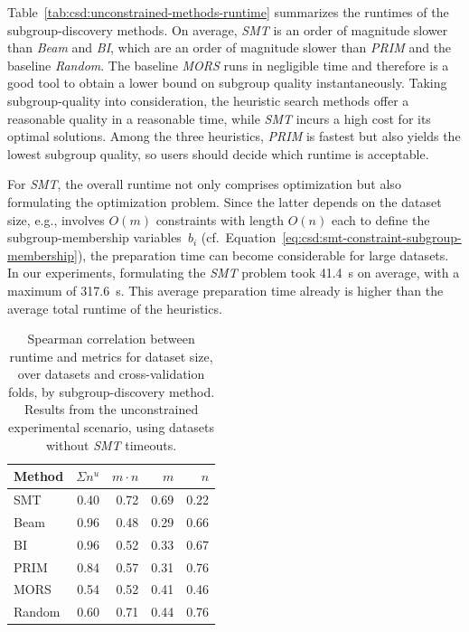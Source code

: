 \documentclass{article}
\theoremstyle{definition}
\begin{document}
Table~\ref{tab:csd:unconstrained-methods-runtime} summarizes the runtimes of the subgroup-discovery methods.
On average, \emph{SMT} is an order of magnitude slower than \emph{Beam} and \emph{BI}, which are an order of magnitude slower than \emph{PRIM} and the baseline \emph{Random}.
The baseline \emph{MORS} runs in negligible time and therefore is a good tool to obtain a lower bound on subgroup quality instantaneously.
Taking subgroup-quality into consideration, the heuristic search methods offer a reasonable quality in a reasonable time, while \emph{SMT} incurs a high cost for its optimal solutions.
Among the three heuristics, \emph{PRIM} is fastest but also yields the lowest subgroup quality, so users should decide which runtime is acceptable.

For \emph{SMT}, the overall runtime not only comprises optimization but also formulating the optimization problem.
Since the latter depends on the dataset size, e.g., involves $O(m)$ constraints with length $O(n)$ each to define the subgroup-membership variables~$b_i$ (cf.~Equation~\ref{eq:csd:smt-constraint-subgroup-membership}), the preparation time can become considerable for large datasets.
In our experiments, formulating the \emph{SMT} problem took 41.4~s on average, with a maximum of 317.6~s.
This average preparation time already is higher than the average total runtime of the heuristics.

\begin{table}
	\centering
	\begin{tabular}{lrrrr}
		\toprule
		Method & $\Sigma n^u$ & $m \cdot n$ & $m$ & $n$ \\
		\midrule
		SMT & 0.40 & 0.72 & 0.69 & 0.22 \\
		Beam & 0.96 & 0.48 & 0.29 & 0.66 \\
		BI & 0.96 & 0.52 & 0.33 & 0.67 \\
		PRIM & 0.84 & 0.57 & 0.31 & 0.76 \\
		MORS & 0.54 & 0.52 & 0.41 & 0.46 \\
		Random & 0.60 & 0.71 & 0.44 & 0.76 \\
		\bottomrule
	\end{tabular}
	\caption{
		Spearman correlation between runtime and metrics for dataset size,
		over datasets and cross-validation folds, by subgroup-discovery method.
		Results from the unconstrained experimental scenario, using datasets without \emph{SMT} timeouts.
	}
	\label{tab:csd:unconstrained-methods-runtime-correlation}
\end{table}
\end{document}
